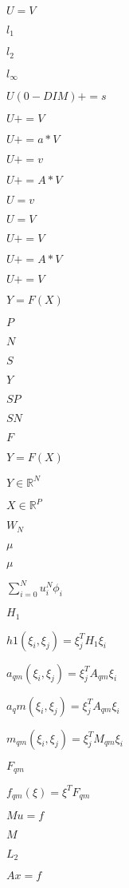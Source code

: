 \documentclass{article}
\begin{document}
$U = V$
\pagebreak

$l_1$
\pagebreak

$l_2$
\pagebreak

$l_\infty$
\pagebreak

$U(0-DIM)+=s$
\pagebreak

$U+=V$
\pagebreak

$U+=a*V$
\pagebreak

$ U+=v $
\pagebreak

$U+=A*V$
\pagebreak

$ U=v $
\pagebreak

$U=V$
\pagebreak

$ U+=V $
\pagebreak

$ U+=A*V$
\pagebreak

$U+=V $
\pagebreak

$ Y=F(X) $
\pagebreak

$ P$
\pagebreak

$ N$
\pagebreak

$ S $
\pagebreak

$ Y$
\pagebreak

$ S P$
\pagebreak

$ S N $
\pagebreak

$ F $
\pagebreak

$ Y = F(X) $
\pagebreak

$ Y \in \mathbb{R}^N$
\pagebreak

$ X \in \mathbb{R}^P$
\pagebreak

$W_N$
\pagebreak

$ \mu$
\pagebreak

$\mu$
\pagebreak

$\sum_{i=0}^N u^N_i \phi_i$
\pagebreak

$H_1$
\pagebreak

$h1(\xi_i, \xi_j) = \xi_j^T H_1 \xi_i$
\pagebreak

$a_{qm}(\xi_i, \xi_j) = \xi_j^T A_{qm} \xi_i$
\pagebreak

$a_qm(\xi_i, \xi_j) = \xi_j^T A_{qm} \xi_i$
\pagebreak

$m_{qm}(\xi_i, \xi_j) = \xi_j^T M_{qm} \xi_i$
\pagebreak

$F_{qm}$
\pagebreak

$f_{qm}(\xi) = \xi^T F_{qm} $
\pagebreak

$M u = f$
\pagebreak

$ M $
\pagebreak

$ L_2 $
\pagebreak

$A x = f$
\pagebreak
\end{document}

